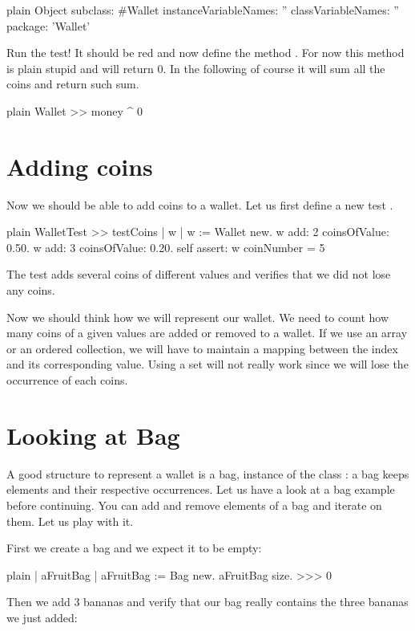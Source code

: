 \documentclass[10pt,twoside,english]{_support/latex/sbabook/sbabook}
\begin{document}
\begin{displaycode}{plain}
Object subclass: #Wallet
	instanceVariableNames: ''
	classVariableNames: ''
	package: 'Wallet'	
\end{displaycode}

Run the test! It should be red and now define the method . For now this method is plain stupid and will return 0.
In the following of course it will sum all the coins and return such sum.

\begin{displaycode}{plain}
Wallet >> money
   ^ 0
\end{displaycode}
\section{Adding coins}
Now we should be able to add coins to a wallet. Let us first define a new test .

\begin{displaycode}{plain}
WalletTest >> testCoins
	| w |
	w := Wallet new.
	w add: 2 coinsOfValue: 0.50.
	w add: 3 coinsOfValue: 0.20.
	self assert: w coinNumber = 5
\end{displaycode}

The test adds several coins of different values and verifies that we did not lose any coins.

Now we should think how we will represent our wallet. We need to count how many coins of a given 
values are added or removed to a wallet. If we use an array or an ordered collection, we will have to maintain a mapping between the index and its corresponding value. Using a set will not really work since we will lose the occurrence of each coins.
\section{Looking at Bag}
A good structure to represent a wallet is a bag, instance of the class : a bag keeps elements and their respective occurrences. Let us have a look at a bag example before continuing.
 You can add and remove elements of a bag and iterate on them.  Let us play with it.

 First we create a bag and we expect it to be empty:

\begin{displaycode}{plain}
| aFruitBag |
aFruitBag := Bag new.
aFruitBag size.
>>> 0
\end{displaycode}

Then we add 3 bananas and verify that our bag really contains the three bananas we just added:
\end{document}
